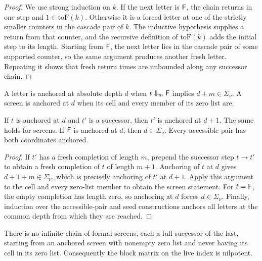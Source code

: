\begin{proof}
\leanok
{}
We use strong induction on $k$. If the next letter is $\mathsf{F}$, the chain returns in one step and
$1\in\mathrm{toF}(k)$. Otherwise it is a forced letter at one of the strictly smaller counters in
the cascade pair of $k$. The inductive hypothesis supplies a return from that counter, and the
recursive definition of $\mathrm{toF}(k)$ adds the initial step to its length. Starting from
$\mathsf{F}$, the next letter lies in the cascade pair of some supported counter, so the same argument
produces another fresh letter. Repeating it shows that fresh return times are unbounded along any
successor chain.
\end{proof}

\begin{definition}
\label{def:anchored}
\leanok
{}
A letter is anchored at absolute depth $d$ when $t\Downarrow_m\mathsf{F}$ implies $d+m\in\Sigma_\nu$. A
screen is anchored at $d$ when its cell and every member of its zero list are.
\end{definition}

\begin{lemma}
\label{thm:anchor-step}
\leanok
{}
If $t$ is anchored at $d$ and $t'$ is a successor, then $t'$ is anchored at $d+1$. The same
holds for screens. If $\mathsf{F}$ is anchored at $d$, then $d\in\Sigma_\nu$. Every accessible pair
has both coordinates anchored.
\end{lemma}

\begin{proof}
\leanok
{}
If $t'$ has a fresh completion of length $m$, prepend the successor step $t\to t'$ to obtain a
fresh completion of $t$ of length $m+1$. Anchoring of $t$ at $d$ gives
$d+1+m\in\Sigma_\nu$, which is precisely anchoring of $t'$ at $d+1$. Apply this argument to
the cell and every zero-list member to obtain the screen statement. For $t=\mathsf{F}$, the empty
completion has length zero, so anchoring at $d$ forces $d\in\Sigma_\nu$. Finally, induction over
the accessible-pair and seed constructions anchors all letters at the common depth from which
they are reached.
\end{proof}

\begin{theorem}
\label{thm:nilpotence}
\leanok
{}
There is no infinite chain of formal screens, each a full successor of the last, starting from
an anchored screen with nonempty zero list and never having its cell in its zero list.
Consequently the block matrix on the live index is nilpotent.
\end{theorem}

